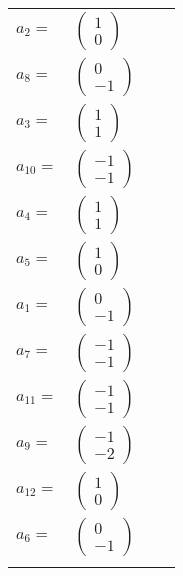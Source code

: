 \documentclass[1p]{elsarticle_modified}
\theoremstyle{definition}
\begin{document}
\begin{tabular}{m{7pt} m{180pt} m{7pt} m{180pt} }
\flushright $a_{2}=$&$\begin{pmatrix}1\\0\end{pmatrix}$ \\
\flushright $a_{8}=$&$\begin{pmatrix}0\\-1\end{pmatrix}$ \\
\flushright $a_{3}=$&$\begin{pmatrix}1\\1\end{pmatrix}$ \\
\flushright $a_{10}=$&$\begin{pmatrix}-1\\-1\end{pmatrix}$ \\
\flushright $a_{4}=$&$\begin{pmatrix}1\\1\end{pmatrix}$ \\
\flushright $a_{5}=$&$\begin{pmatrix}1\\0\end{pmatrix}$ \\
\flushright $a_{1}=$&$\begin{pmatrix}0\\-1\end{pmatrix}$ \\
\flushright $a_{7}=$&$\begin{pmatrix}-1\\-1\end{pmatrix}$ \\
\flushright $a_{11}=$&$\begin{pmatrix}-1\\-1\end{pmatrix}$ \\
\flushright $a_{9}=$&$\begin{pmatrix}-1\\-2\end{pmatrix}$ \\
\flushright $a_{12}=$&$\begin{pmatrix}1\\0\end{pmatrix}$ \\
\flushright $a_{6}=$&$\begin{pmatrix}0\\-1\end{pmatrix}$\\&\end{tabular}
\end{document}
